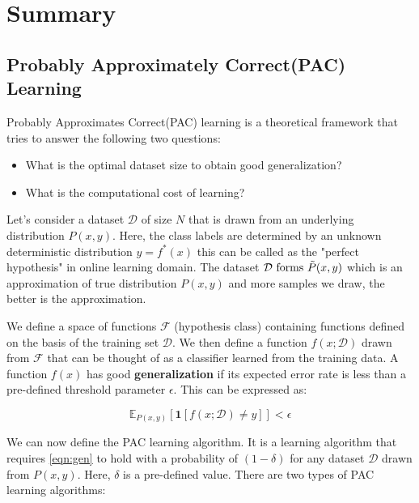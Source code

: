 \documentclass[11pt]{article}
\begin{document}
\section{Summary}



\subsection{Probably Approximately Correct(PAC) Learning}
\normalfont

Probably Approximates Correct(PAC) learning is a theoretical framework that tries to answer the following two questions:
\begin{itemize}
\item What is the optimal dataset size to obtain good generalization?
\item What is the computational cost of learning?
\end{itemize}

Let's consider a dataset $\mathcal{D}$ of size $N$ that is drawn from an underlying distribution $P(x,y)$. Here, the class labels are determined by an unknown deterministic distribution $y=f^*(x)$ this can be called as the "perfect hypothesis" in online learning domain. The dataset $\mathcal{D} \text{ forms } \Tilde{P}(x,y) $ which is an approximation of true distribution $P(x,y)$ and more samples we draw, the better is the approximation. 

We define a space of functions $\mathcal{F}$ (hypothesis class) containing functions defined on the basis of the training set $\mathcal{D}$. We then define a function $f(x;\mathcal{D})$ drawn from $\mathcal{F}$ that can be thought of as a classifier learned from the training data. A function $f(x)$ has good \textbf{generalization} if its expected error rate is less than a pre-defined threshold parameter $\epsilon$. This can be expressed as:

\begin{equation}
    \mathbb{E}_{P(x, y)}[\mathbf{1}[f(x; \mathcal{D}) \neq y]] < \epsilon
    \label{eqn:gen}
\end{equation}

We can now define the PAC learning algorithm. It is a learning algorithm that requires \eqref{eqn:gen} to hold with a probability of $(1-\delta)$ for any dataset $\mathcal{D}$ drawn from $P(x,y)$. Here, $\delta$ is a pre-defined value. There are two types of PAC learning algorithms:

\end{document}
